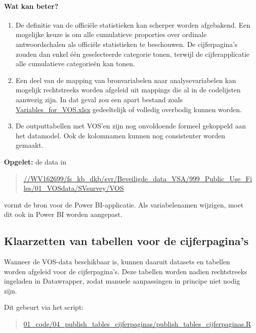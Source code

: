\documentclass{VSAnote}
\begin{document}
\paragraph{Wat kan beter?}

\begin{enumerate}
\item De definitie van de officiële statistieken kan scherper worden afgebakend. Een mogelijke keuze is om alle cumulatieve proporties over ordinale antwoordschalen als officiële statistieken te beschouwen. De cijferpagina's zouden dan enkel één geselecteerde categorie tonen, terwijl de cijferapplicatie alle cumulatieve categorieën kan tonen.

\item Een deel van de mapping van bronvariabelen naar analysevariabelen kan mogelijk rechtstreeks worden afgeleid uit mappings die al in de codelijsten aanwezig zijn. In dat geval zou een apart bestand zoals \url{Variables_for_VOS.xlsx} gedeeltelijk of volledig overbodig kunnen worden.

\item De outputtabellen met VOS'en zijn nog onvoldoende formeel gekoppeld aan het datamodel. Ook de kolomnamen kunnen nog consistenter worden gemaakt.
\end{enumerate}

\textbf{Opgelet:} de data in
\begin{quote}
\url{//WV162699/fs_kb_dkb/svr/Beveiligde_data_VSA/999_Public_Use_Files/01_VOSdata/SVsurvey/VOS}
\end{quote}
vormt de bron voor de Power BI-applicatie. Als variabelenamen wijzigen, moet dit ook in Power BI worden aangepast.




\subsection{Klaarzetten van tabellen voor de cijferpagina's}
\label{sec:cijferpaginas}

Wanneer de VOS-data beschikbaar is, kunnen daaruit datasets en tabellen worden afgeleid voor de cijferpagina's. Deze tabellen worden nadien rechtstreeks ingeladen in Datawrapper, zodat manuele aanpassingen in principe niet nodig zijn.

Dit gebeurt via het script:
\begin{quote}
\url{01_code/04_publish_tables_cijferpaginas/publish_tables_cijferpaginas.R}
\end{quote}
\end{document}
